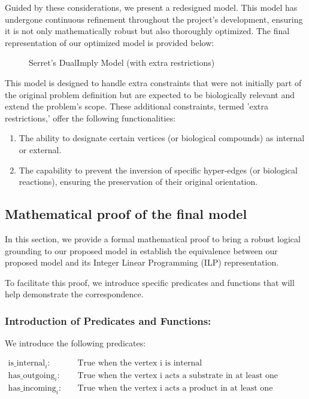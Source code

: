 Guided by these considerations, we present a redesigned model. This model has undergone continuous refinement throughout the project's development, ensuring it is not only mathematically robust but also thoroughly optimized. The final representation of our optimized model is provided below:

\begin{figure}[H]
    \centering
    \caption{Serret's DualImply Model (with extra restrictions)}
    \label{fig:zephyr}
\end{figure}

This model is designed to handle extra constraints that were not initially part of the original problem definition but are expected to be biologically relevant and extend the problem's scope. These additional constraints, termed 'extra restrictions,' offer the following functionalities:

\begin{enumerate}
    \item The ability to designate certain vertices (or biological compounds) as internal or external.

    \item The capability to prevent the inversion of specific hyper-edges (or biological reactions), ensuring the preservation of their original orientation.
\end{enumerate}
    
    
\subsection{Mathematical proof of the final model} \label{sec:math_proof}

In this section, we provide a formal mathematical proof to bring a robust logical grounding to our proposed model in establish the equivalence between our proposed model and its Integer Linear Programming (ILP) representation. 

To facilitate this proof, we introduce specific predicates and functions that will help demonstrate the correspondence.

\subsubsection{Introduction of Predicates and Functions:}

We introduce the following predicates:
    
\begin{align*}
    \text{is\_internal}_{i} : \quad&\text{True when the vertex i is internal}\\
    \text{has\_outgoing}_{i} : \quad&\text{True when the vertex i acts a substrate in at least one hyperedge} \\
    \text{has\_incoming}_{i} : \quad&\text{True when the vertex i acts a product in at least one hyperedge} \\
\end{align*}

